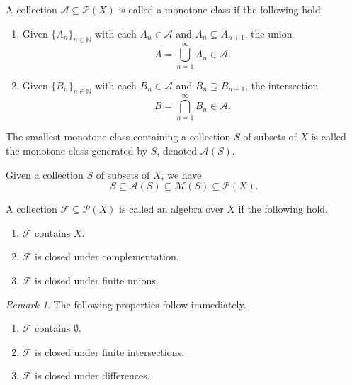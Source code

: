 \documentclass[11pt]{article}
\newcommand{\N}{\mathbb{N}}
\newcommand{\M}{\mathcal{M}}
\theoremstyle{definition}
\theoremstyle{remark}
\newtheorem*{remark}{Remark}
\numberwithin{equation}{section}
\begin{document}
    \begin{definition}
        A collection $\mathcal{A} \subseteq \mathcal{P}(X)$ is called a monotone
        class if the following hold.
        \begin{enumerate}
            \itemsep0em
            \item Given $\{A_n\}_{n \in \N}$ with each $A_n \in \mathcal{A}$ and $A_n
            \subseteq A_{n + 1}$, the union \[
                A = \bigcup_{n = 1}^\infty A_n \in \mathcal{A}.
            \]
            \item Given $\{B_n\}_{n \in \N}$ with each $B_n \in \mathcal{A}$ and $B_n
            \supseteq B_{n + 1}$, the intersection \[
                B = \bigcap_{n = 1}^\infty B_n \in \mathcal{A}.
            \]
        \end{enumerate}
    \end{definition}

    \begin{definition}
        The smallest monotone class containing a collection $S$ of subsets of $X$ is
        called the monotone class generated by $S$, denoted $\mathcal{A}(S)$.
    \end{definition}

    \begin{lemma}
        Given a collection $S$ of subsets of $X$, we have \[
            S \subseteq \mathcal{A}(S) \subseteq \M(S) \subseteq \mathcal{P}(X).
        \]
    \end{lemma}

    \begin{definition}
        A collection $\mathcal{F} \subseteq \mathcal{P}(X)$ is called an algebra over
        $X$ if the following hold.
        \begin{enumerate}
            \itemsep0em
            \item $\mathcal{F}$ contains $X$.
            \item $\mathcal{F}$ is closed under complementation.
            \item $\mathcal{F}$ is closed under finite unions.
        \end{enumerate}
        \begin{remark}
            The following properties follow immediately.
            \begin{enumerate}
                \itemsep0em
                \item $\mathcal{F}$ contains $\emptyset$.
                \item $\mathcal{F}$ is closed under finite intersections.
                \item $\mathcal{F}$ is closed under differences.
            \end{enumerate}
        \end{remark}
    \end{definition}
\end{document}
